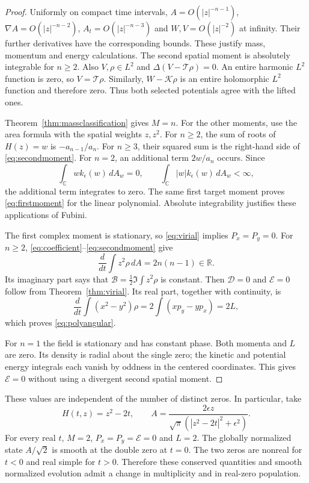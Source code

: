 \documentclass[11pt]{article}
\newcommand{\C}{\mathbb C}
\newcommand{\R}{\mathbb R}
\newcommand{\dd}{\,d}
\newcommand{\eps}{\epsilon}
\newcommand{\cT}{\mathcal T}
\newcommand{\cE}{\mathcal E}
\newcommand{\cD}{\mathcal D}
\newcommand{\cB}{\mathcal B}
\theoremstyle{definition}
\theoremstyle{remark}
\begin{document}
\begin{proof}
Uniformly on compact time intervals, $A=O(|z|^{-n-1})$,
$\nabla A=O(|z|^{-n-2})$, $A_t=O(|z|^{-n-3})$ and
$W,V=O(|z|^{-2})$ at infinity. Their further derivatives have the
corresponding bounds. These justify mass, momentum and energy
calculations. The second spatial moment is absolutely integrable for
$n\ge2$. Also $V,\rho\in L^2$ and $\Delta(V-\cT\rho)=0$.
An entire harmonic $L^2$ function is zero, so $V=\cT\rho$.
Similarly, $W-\mathcal K\rho$ is an entire holomorphic $L^2$
function and therefore zero. Thus both selected potentials agree
with the lifted ones.

Theorem~\ref{thm:massclassification} gives $M=n$. For the other
moments, use the area formula with the spatial weights $z,z^2$.
For $n\ge2$, the sum of roots of $H(z)=w$ is
$-a_{n-1}/a_n$. For $n\ge3$, their squared sum is the right-hand side
of \eqref{eq:secondmoment}. For $n=2$, an additional term $2w/a_n$
occurs. Since
\[
 \int_\C w k_\eps(w)\dd A_w=0,
 \qquad \int_\C |w|k_\eps(w)\dd A_w<\infty,
\]
the additional term integrates to zero. The same first target moment
proves \eqref{eq:firstmoment} for the linear polynomial. Absolute
integrability justifies these applications of Fubini.

The first complex moment is stationary, so
\eqref{eq:virial} implies $P_x=P_y=0$. For $n\ge2$,
\eqref{eq:coefficient}--\eqref{eq:secondmoment} give
\begin{equation}
 \frac d{dt}\int z^2\rho\dd A=2n(n-1)\in\R.
 \label{eq:secondderivative}
\end{equation}
Its imaginary part says that $\cB=\tfrac12\Im\int z^2\rho$
is constant. Then $\cD=0$ and $\cE=0$ follow from
Theorem~\ref{thm:virial}. Its real part, together with continuity,
is
\[
 \frac d{dt}\int(x^2-y^2)\rho
 =2\int(xp_y-yp_x)=2L,
\]
which proves \eqref{eq:polyangular}.

For $n=1$ the field is stationary and has constant phase. Both momenta
and $L$ are zero. Its density is radial about the single zero;
the kinetic and potential energy integrals each vanish by oddness in
the centered coordinates. This gives $\cE=0$ without using a
divergent second spatial moment.
\end{proof}

These values are independent of the number of distinct zeros. In
particular, take
\begin{equation}
 H(t,z)=z^2-2t,\qquad
 A=\frac{2\eps z}{\sqrt\pi(|z^2-2t|^2+\eps^2)}.
 \label{eq:doublecontrol}
\end{equation}
For every real $t$, $M=2$, $P_x=P_y=\cE=0$ and $L=2$.
The globally normalized state $A/\sqrt2$ is smooth at the double
zero at $t=0$. The two zeros are nonreal for $t<0$ and real simple
for $t>0$. Therefore these conserved quantities and smooth normalized
evolution admit a change in multiplicity and in real-zero population.
\end{document}
